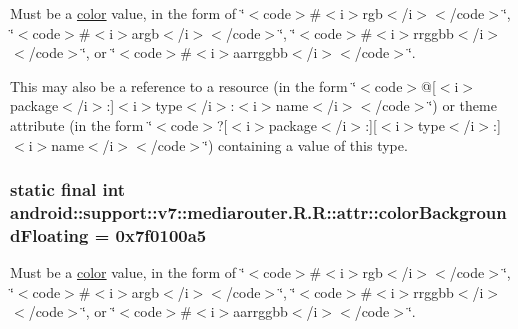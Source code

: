 Must be a \hyperlink{classandroid_1_1support_1_1v7_1_1mediarouter_1_1_r_1_1color}{color} value, in the form of \char`\"{}$<$code$>$\#$<$i$>$rgb$<$/i$>$$<$/code$>$\char`\"{}, \char`\"{}$<$code$>$\#$<$i$>$argb$<$/i$>$$<$/code$>$\char`\"{}, \char`\"{}$<$code$>$\#$<$i$>$rrggbb$<$/i$>$$<$/code$>$\char`\"{}, or \char`\"{}$<$code$>$\#$<$i$>$aarrggbb$<$/i$>$$<$/code$>$\char`\"{}. 

This may also be a reference to a resource (in the form \char`\"{}$<$code$>$@\mbox{[}$<$i$>$package$<$/i$>$:\mbox{]}$<$i$>$type$<$/i$>$:$<$i$>$name$<$/i$>$$<$/code$>$\char`\"{}) or theme attribute (in the form \char`\"{}$<$code$>$?\mbox{[}$<$i$>$package$<$/i$>$:\mbox{]}\mbox{[}$<$i$>$type$<$/i$>$:\mbox{]}$<$i$>$name$<$/i$>$$<$/code$>$\char`\"{}) containing a value of this type. \hypertarget{classandroid_1_1support_1_1v7_1_1mediarouter_1_1_r_1_1attr_f6785f30df82829d11839c86269f279d}{
\subsubsection[{colorBackgroundFloating}]{\setlength{\rightskip}{0pt plus 5cm}static final int android::support::v7::mediarouter.R.R::attr::colorBackgroundFloating = 0x7f0100a5}}
\label{classandroid_1_1support_1_1v7_1_1mediarouter_1_1_r_1_1attr_f6785f30df82829d11839c86269f279d}


Must be a \hyperlink{classandroid_1_1support_1_1v7_1_1mediarouter_1_1_r_1_1color}{color} value, in the form of \char`\"{}$<$code$>$\#$<$i$>$rgb$<$/i$>$$<$/code$>$\char`\"{}, \char`\"{}$<$code$>$\#$<$i$>$argb$<$/i$>$$<$/code$>$\char`\"{}, \char`\"{}$<$code$>$\#$<$i$>$rrggbb$<$/i$>$$<$/code$>$\char`\"{}, or \char`\"{}$<$code$>$\#$<$i$>$aarrggbb$<$/i$>$$<$/code$>$\char`\"{}. 

